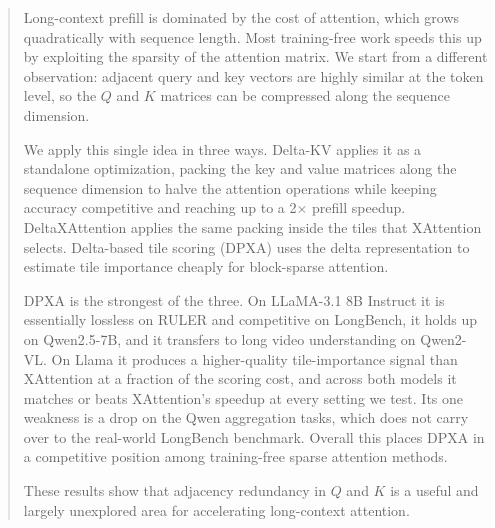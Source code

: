 \begin{abstract}
Long-context prefill is dominated by the cost of attention, which grows quadratically with sequence length. Most training-free work speeds this up by exploiting the sparsity of the attention matrix. We start from a different observation: adjacent query and key vectors are highly similar at the token level, so the $Q$ and $K$ matrices can be compressed along the sequence dimension.

We apply this single idea in three ways. Delta-KV applies it as a standalone optimization, packing the key and value matrices along the sequence dimension to halve the attention operations while keeping accuracy competitive and reaching up to a 2$\times$ prefill speedup. DeltaXAttention applies the same packing inside the tiles that XAttention selects. Delta-based tile scoring (DPXA) uses the delta representation to estimate tile importance cheaply for block-sparse attention.

DPXA is the strongest of the three. On LLaMA-3.1 8B Instruct it is essentially lossless on RULER and competitive on LongBench, it holds up on Qwen2.5-7B, and it transfers to long video understanding on Qwen2-VL. On Llama it produces a higher-quality tile-importance signal than XAttention at a fraction of the scoring cost, and across both models it matches or beats XAttention's speedup at every setting we test. Its one weakness is a drop on the Qwen aggregation tasks, which does not carry over to the real-world LongBench benchmark. Overall this places DPXA in a competitive position among training-free sparse attention methods.

These results show that adjacency redundancy in $Q$ and $K$ is a useful and largely unexplored area for accelerating long-context attention.
\end{abstract}
